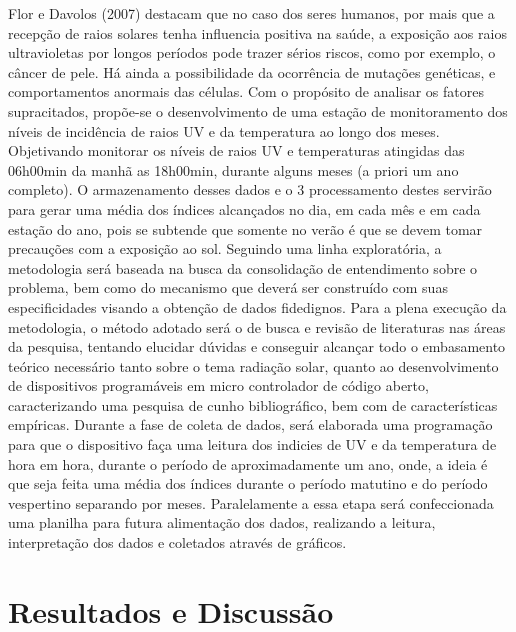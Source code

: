 \documentclass[article,12pt,onesidea,4paper,english,brazil]{abntex2}
\begin{document}
	Flor e Davolos (2007) destacam que no caso dos seres humanos, por mais que a recepção de raios solares tenha influencia positiva na saúde, a exposição aos raios ultravioletas por longos períodos pode trazer sérios riscos, como por exemplo, o câncer de pele. Há ainda a possibilidade da ocorrência de mutações genéticas, e comportamentos anormais das células.
	Com o propósito de analisar os fatores supracitados, propõe-se o desenvolvimento de uma estação de monitoramento dos níveis de incidência de raios UV e da temperatura ao longo dos meses. Objetivando monitorar os níveis de raios UV e temperaturas atingidas das 06h00min da manhã as 18h00min, durante alguns meses (a priori um ano completo). O armazenamento desses dados e o
	3
	processamento destes servirão para gerar uma média dos índices alcançados no dia, em cada mês e em cada estação do ano, pois se subtende que somente no verão é que se devem tomar precauções com a exposição ao sol.
	Seguindo uma linha exploratória, a metodologia será baseada na busca da consolidação de entendimento sobre o problema, bem como do mecanismo que deverá ser construído com suas especificidades visando a obtenção de dados fidedignos. Para a plena execução da metodologia, o método adotado será o de busca e revisão de literaturas nas áreas da pesquisa, tentando elucidar dúvidas e conseguir alcançar todo o embasamento teórico necessário tanto sobre o tema radiação solar, quanto ao desenvolvimento de dispositivos programáveis em micro controlador de código aberto, caracterizando uma pesquisa de cunho bibliográfico, bem com de características empíricas.
	Durante a fase de coleta de dados, será elaborada uma programação para que o dispositivo faça uma leitura dos indicies de UV e da temperatura de hora em hora, durante o período de aproximadamente um ano, onde, a ideia é que seja feita uma média dos índices durante o período matutino e do período vespertino separando por meses. Paralelamente a essa etapa será confeccionada uma planilha para futura alimentação dos dados, realizando a leitura, interpretação dos dados e coletados através de gráficos.
	
	\section*{Resultados e Discussão}
	
\end{document}
